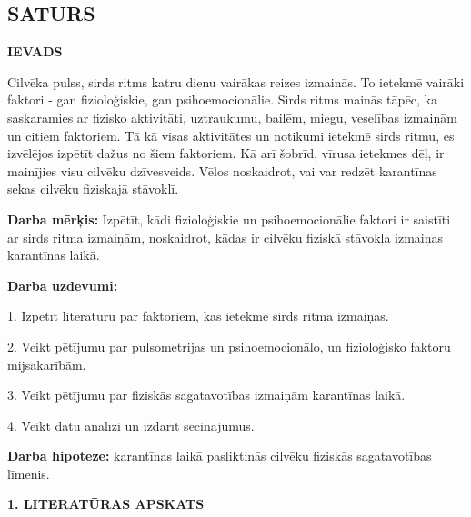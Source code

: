 \documentclass[12pt]{article}
\begin{document}
\newpage
\begin{titlepage}

\section*{\centering\textbf{SATURS}}
\def\contentsname{\empty}
\tableofcontents



\end{titlepage}

\newpage
\begin{titlepage}
\begin{center}
{\large \bf IEVADS}
\end{center}

Cilvēka pulss, sirds ritms katru dienu vairākas reizes izmainās. To ietekmē vairāki faktori - gan fizioloģiskie, gan psihoemocionālie. Sirds ritms mainās tāpēc, ka saskaramies ar fizisko aktivitāti, uztraukumu, bailēm, miegu, veselības izmaiņām un citiem faktoriem. Tā kā visas aktivitātes un notikumi ietekmē sirds ritmu, es izvēlējos izpētīt dažus no šiem faktoriem. Kā arī šobrīd, vīrusa ietekmes dēļ, ir mainījies visu cilvēku dzīvesveids. Vēlos noskaidrot, vai var redzēt karantīnas sekas cilvēku fiziskajā stāvoklī.

\textbf{Darba mērķis:} Izpētīt, kādi fizioloģiskie un psihoemocionālie faktori ir saistīti ar sirds ritma izmaiņām, noskaidrot, kādas ir cilvēku fiziskā stāvokļa izmaiņas karantīnas laikā. \par
\textbf{Darba uzdevumi:} \par
1.	Izpētīt literatūru par faktoriem, kas ietekmē sirds ritma izmaiņas. \par
2.	Veikt pētījumu par pulsometrijas un psihoemocionālo, un fizioloģisko faktoru mijsakarībām. \par
3.	Veikt pētījumu par fiziskās sagatavotības izmaiņām karantīnas laikā. \par
4.	Veikt datu analīzi un izdarīt secinājumus. \par
\textbf{Darba hipotēze:} karantīnas laikā pasliktinās cilvēku fiziskās sagatavotības līmenis.

\end{titlepage}
\newpage

\pagestyle{fancy}
\fancyhf{}
\rfoot{\thepage}
\setcounter{page}{5}

\begin{center}
{\large \bf 1. LITERATŪRAS APSKATS}
\end{center}
\end{document}
